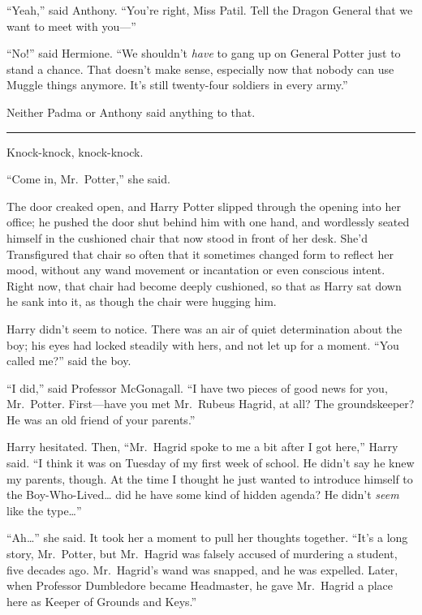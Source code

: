 ``Yeah,'' said Anthony. ``You're right, Miss Patil. Tell the Dragon
General that we want to meet with you---''

``No!'' said Hermione. ``We shouldn't \emph{have} to gang up on General
Potter just to stand a chance. That doesn't make sense, especially now
that nobody can use Muggle things anymore. It's still twenty-four
soldiers in every army.''

Neither Padma or Anthony said anything to that.

\begin{center}\rule{3in}{0.4pt}\end{center}

Knock-knock, knock-knock.

``Come in, Mr.~Potter,'' she said.

The door creaked open, and Harry Potter slipped through the opening into
her office; he pushed the door shut behind him with one hand, and
wordlessly seated himself in the cushioned chair that now stood in front
of her desk. She'd Transfigured that chair so often that it sometimes
changed form to reflect her mood, without any wand movement or
incantation or even conscious intent. Right now, that chair had become
deeply cushioned, so that as Harry sat down he sank into it, as though
the chair were hugging him.

Harry didn't seem to notice. There was an air of quiet determination
about the boy; his eyes had locked steadily with hers, and not let up
for a moment. ``You called me?'' said the boy.

``I did,'' said Professor McGonagall. ``I have two pieces of good news
for you, Mr.~Potter. First---have you met Mr.~Rubeus Hagrid, at all? The
groundskeeper? He was an old friend of your parents.''

Harry hesitated. Then, ``Mr.~Hagrid spoke to me a bit after I got
here,'' Harry said. ``I think it was on Tuesday of my first week of
school. He didn't say he knew my parents, though. At the time I thought
he just wanted to introduce himself to the Boy-Who-Lived\ldots{} did he
have some kind of hidden agenda? He didn't \emph{seem} like the
type\ldots{}''

``Ah\ldots{}'' she said. It took her a moment to pull her thoughts
together. ``It's a long story, Mr.~Potter, but Mr.~Hagrid was falsely
accused of murdering a student, five decades ago. Mr.~Hagrid's wand was
snapped, and he was expelled. Later, when Professor Dumbledore became
Headmaster, he gave Mr.~Hagrid a place here as Keeper of Grounds and
Keys.''

